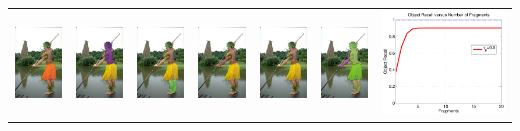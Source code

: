\documentclass[runningheads,a4paper]{llncs}
\begin{document}
\begin{table}[h!]
\begin{tabular}{|c | c | c | c | c | c | c |}
    \includegraphics[height=0.15\linewidth]{figs/101087_top_1_fragments.jpg}&
    \includegraphics[height=0.15\linewidth]{figs/101087_top_2_fragments.jpg}&
    \includegraphics[height=0.15\linewidth]{figs/101087_top_3_fragments.jpg}&
    \includegraphics[height=0.15\linewidth]{figs/101087_top_4_fragments.jpg}&
    \includegraphics[height=0.15\linewidth]{figs/101087_top_5_fragments.jpg}&
    \includegraphics[height=0.15\linewidth]{figs/101087_top_20_fragments_montage.jpg}&
    \includegraphics[width=0.14\linewidth]{figs/101087_object_recall_vs_fragments.pdf} \\

\end{tabular}
\end{table}
\end{document}
